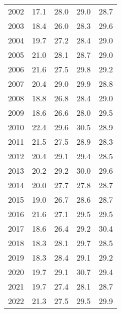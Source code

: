 \documentclass[a4paper, platex, dvipdfmx]{jsarticle}
\begin{document}
\begin{table}
\begin{tabular}{ccccc}
    2002 & 17.1 & 28.0 & 29.0 & 28.7  \\
    2003 & 18.4 & 26.0 & 28.3 & 29.6  \\
    2004 & 19.7 & 27.2 & 28.4 & 29.0  \\
    2005 & 21.0 & 28.1 & 28.7 & 29.0  \\
    2006 & 21.6 & 27.5 & 29.8 & 29.2  \\
    2007 & 20.4 & 29.0 & 29.9 & 28.8  \\
    2008 & 18.8 & 26.8 & 28.4 & 29.0  \\
    2009 & 18.6 & 26.6 & 28.0 & 29.5  \\
    2010 & 22.4 & 29.6 & 30.5 & 28.9  \\
    2011 & 21.5 & 27.5 & 28.9 & 28.3  \\
    2012 & 20.4 & 29.1 & 29.4 & 28.5  \\
    2013 & 20.2 & 29.2 & 30.0 & 29.6  \\
    2014 & 20.0 & 27.7 & 27.8 & 28.7  \\
    2015 & 19.0 & 26.7 & 28.6 & 28.7  \\
    2016 & 21.6 & 27.1 & 29.5 & 29.5  \\
    2017 & 18.6 & 26.4 & 29.2 & 30.4  \\
    2018 & 18.3 & 28.1 & 29.7 & 28.5  \\
    2019 & 18.3 & 28.4 & 29.1 & 29.2  \\
    2020 & 19.7 & 29.1 & 30.7 & 29.4  \\
    2021 & 19.7 & 27.4 & 28.1 & 28.7  \\
    2022 & 21.3 & 27.5 & 29.5 & 29.9  \\\hline
  \end{tabular}
\end{table}
\end{document}
